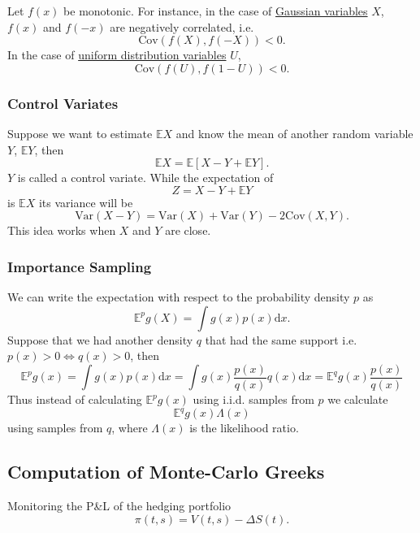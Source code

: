 \documentclass[twocolumn,landscape,10pt]{article}
\theoremstyle{definition}
\begin{document}
Let $f(x)$ be monotonic. 
For instance, in the case of \underline{Gaussian variables} $X$, 
$f(x)$ and $f(-x)$ are negatively correlated, i.e.\
\[
    \text{Cov}(f(X), f(-X)) < 0.
\]
In the case of \underline{uniform distribution variables} $U$, 
\[
    \text{Cov}(f(U), f(1-U)) < 0.
\]

\subsubsection{Control Variates}

Suppose we want to estimate $\mathbb{E}X$ and know the mean of another random
variable $Y$, $\mathbb{E}Y$, then
\[
    \mathbb{E}X=\mathbb{E}[X-Y+\mathbb{E}Y].
\]
$Y$ is called a control variate. While the expectation of
\[
    Z=X-Y+\mathbb{E}Y
\]
is $\mathbb{E}X$ its variance will be
\[
    \text{Var}(X-Y)=\text{Var}(X)+\text{Var}(Y)-2\text{Cov}(X,Y).
\]
This idea works when $X$ and $Y$ are close.

\subsubsection{Importance Sampling}

We can write the expectation with respect to the probability density $p$ as
\[
    \mathbb{E}^pg(X)=\int g(x)p(x)\mathrm{d}x.
\]
Suppose that we had another density $q$ that had the same support i.e.\
$p(x)>0\iff q(x)>0$, then
\[
    \mathbb{E}^pg(x)
    =\int g(x)p(x)\mathrm{d}x
    =\int g(x) \frac{p(x)}{q(x)}q(x)\mathrm{d}x
    =\mathbb{E}^qg(x) \frac{p(x)}{q(x)}
\]
Thus instead of calculating $\mathbb{E}^pg(x)$ using i.i.d. samples from $p$ we
calculate
\[
    \mathbb{E}^qg(x)\Lambda(x)
\]
using samples from $q$, where $\Lambda(x)$ is the likelihood ratio.

\subsection{Computation of Monte-Carlo Greeks}

Monitoring the P\&L of the hedging portfolio
\[
    \pi(t,s)=V(t,s)-\Delta S(t).
\]
\end{document}
